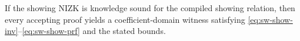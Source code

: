 \begin{corollary}\label{cor:showing-proof-consequence}
If the showing NIZK is knowledge sound for the compiled showing relation, then every accepting proof yields a
coefficient-domain witness satisfying \eqref{eq:sw-show-inv}--\eqref{eq:sw-show-prf} and the stated bounds.
\end{corollary}
